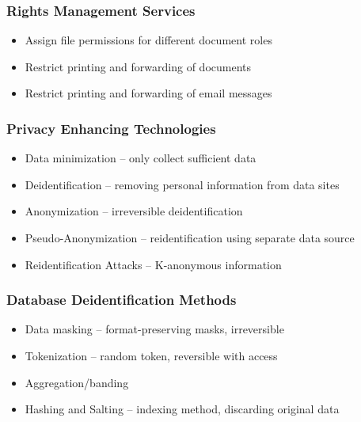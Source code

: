 		\subsubsection {Rights Management Services}
			\begin{itemize}
				\item Assign file permissions for different document roles
				\item Restrict printing and forwarding of documents
				\item Restrict printing and forwarding of email messages
			\end{itemize}
		\subsubsection {Privacy Enhancing Technologies}
			\begin{itemize}
				\item Data minimization -- only collect sufficient data
				\item Deidentification -- removing personal information from data sites
				\item Anonymization -- irreversible deidentification
				\item Pseudo-Anonymization -- reidentification using separate data source
				\item Reidentification Attacks -- K-anonymous information
			\end{itemize}
		\subsubsection {Database Deidentification Methods}
			\begin{itemize}
				\item Data masking -- format-preserving masks, irreversible
				\item Tokenization -- random token, reversible with access
				\item Aggregation/banding
				\item Hashing and Salting -- indexing method, discarding original data
			\end{itemize}
